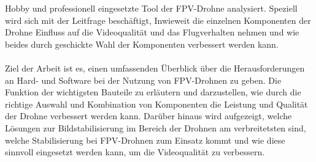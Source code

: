    Hobby und professionell eingesetzte Tool der FPV-Drohne analysiert. Speziell wird sich mit der
    Leitfrage beschäftigt, Inwieweit die einzelnen Komponenten der Drohne Einfluss auf die Videoqualität
    und das Flugverhalten nehmen und wie beides durch geschickte Wahl der Komponenten verbessert werden kann.\\
    \\
    Ziel der Arbeit ist es, einen umfassenden Überblick über die Herausforderungen an Hard- und Software bei
    der Nutzung von FPV-Drohnen zu geben. Die Funktion der wichtigsten Bauteile zu erläutern und darzustellen,
    wie durch die richtige Auswahl und Kombination von Komponenten die Leistung und Qualität der Drohne verbessert
    werden kann. Darüber hinaus wird aufgezeigt, welche Lösungen zur Bildstabilisierung im Bereich der Drohnen am
    verbreitetsten sind, welche Stabilisierung bei FPV-Drohnen zum Einsatz kommt und wie diese sinnvoll eingesetzt
    werden kann, um die Videoqualität zu verbessern.